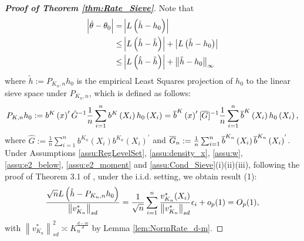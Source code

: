 \documentclass[12pt,american]{article}
\theoremstyle{definition}
\theoremstyle{plain}
\theoremstyle{definition}
\theoremstyle{plain}
\theoremstyle{plain}
\theoremstyle{plain}
\theoremstyle{plain}
\theoremstyle{plain}
\newcommand{\norm}[1]{\left\| #1 \right\|}
\begin{document}
\begin{proof}[\textbf{Proof of Theorem \ref{thm:Rate_Sieve}}]
Note that
\begin{align*}
\left|\hat{\t}-\t_{0}\right|= & \left|L\left(\hat{h}-h_{0}\right)\right|\\
\leq & \left|L\left(\hat{h}-\tilde{h}\right)\right|+\left|L\left(\tilde{h}-h_{0}\right)\right|\\
\leq & \left|L\left(\hat{h}-\tilde{h}\right)\right|+\norm{\tilde{h}-h_{0}}_{\infty}
\end{align*}
where $\tilde{h} := P_{K_n,n}h_0$ is the empirical Least Squares projection of $h_0$ to the linear sieve space under $P_{K_n,n}$, which is defined as follows:
\[
P_{K,n}h_0:= b^{K}\left(x\right)^{\prime}\hat{G}^{-1}\frac{1}{n}\sum_{i=1}^{n} b^{K}\left(X_{i}\right)h_0\left(X_{i}\right)
=\overline{b}^{K}\left(x\right)^{\prime}[\overline{G}]^{-1}\frac{1}{n}\sum_{i=1}^{n} \overline{b}^{K}\left(X_{i}\right)h_0\left(X_{i}\right),
\]
where $\hat{G}:=\frac{1}{n}\sum_{i=1}^{n} b^{K_{n}}\left(X_{i}\right) b^{K_{n}}\left(X_{i}\right)^{'}$ and ${\overline{G}}_n:=\frac{1}{n}\sum_{i=1}^{n} \overline{b}^{K_{n}}\left(X_{i}\right) \overline{b}^{K_{n}}\left(X_{i}\right)^{'}$.
Under Assumptions \ref{assu:RegLevelSet}, \ref{assu:density_x}, \ref{assu:w}, \ref{assu:e2_below}, \ref{assu:e2_moment} and \ref{assu:Cond_Sieve}(i)(ii)(iii), following the proof of Theorem 3.1 of \citet*{chen2015optimal}, under the i.i.d. setting,
we obtain result (1):
\[
\frac{\sqrt{n}L\left(\hat{h}-P_{K_n,n}h_0\right)}{\norm{v_{K_{n}}^{*}}_{sd}} = \frac{1}{\sqrt{n}}\sum_{i=1}^n \frac{v_{K_n}^*(X_i)}{\norm{v_{K_{n}}^{*}}_{sd}}\e_i +o_p(1)=O_p (1),
\]
with $\norm{v_{K_{n}}^{*}}_{sd}^{2}\asymp K_{n}^{\frac{d-m}{d}}$
by Lemma \ref{lem:NormRate_d-m}.


\end{proof}
\end{document}
